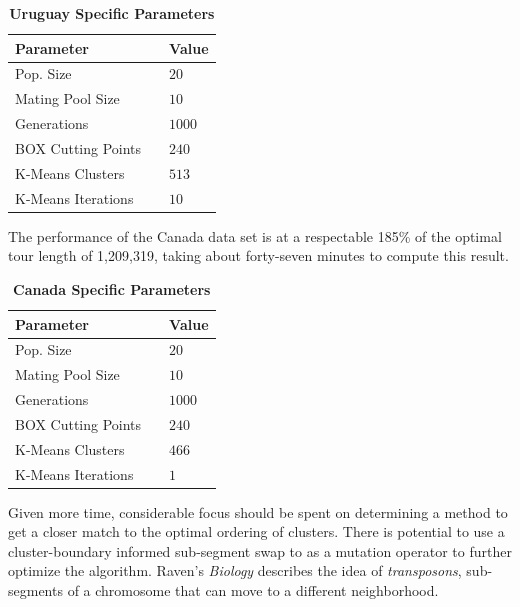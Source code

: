 \documentclass[12pt,twocolumn,oneside]{osajnl}
\begin{document}
\begin{table}[htbp]
\centering
\caption{\bf Uruguay Specific Parameters}
\begin{tabular}{lll}
\hline
Parameter && Value \\
\hline
Pop. Size && $20$ \\
Mating Pool Size && $10$ \\
Generations && $1000$ \\
BOX Cutting Points && $240$ \\
K-Means Clusters && $513$ \\
K-Means Iterations && $10$ \\
\hline
\end{tabular}
  \label{tab:ur}
\end{table}

The performance of the Canada data set is at a respectable 185\% of the optimal tour length of 1,209,319, taking about forty-seven minutes to compute this result. 

\begin{table}[htbp]
\centering
\caption{\bf Canada Specific Parameters}
\begin{tabular}{lll}
\hline
Parameter && Value \\
\hline
Pop. Size && $20$ \\
Mating Pool Size && $10$ \\
Generations && $1000$ \\
BOX Cutting Points && $240$ \\
K-Means Clusters && $466$ \\
K-Means Iterations && $1$ \\
\hline
\end{tabular}
  \label{tab:can}
\end{table}

Given more time, considerable focus should be spent on determining a method to get a closer match to the optimal ordering of clusters. There is potential to use a cluster-boundary informed sub-segment swap to as a mutation operator to further optimize the algorithm. Raven's \textit{Biology}\cite{raven2001biology} describes the idea of \textit{transposons}, sub-segments of a chromosome that can move to a different neighborhood.
\end{document}
